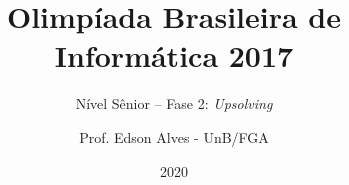 \title{Olimpíada Brasileira de Informática 2017}
\subtitle{Nível Sênior -- Fase 2: {\it Upsolving}}
\author{Prof. Edson Alves - UnB/FGA}
\date{2020}
